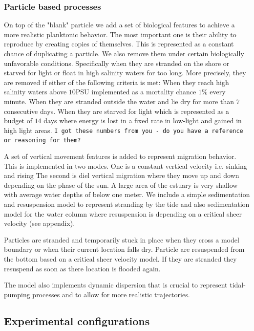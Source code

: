 \documentclass[npg, manuscript]{copernicus}
\begin{document}
\subsubsection{Particle based processes}

On top of the "blank" particle we add a set of biological features to achieve a more realistic planktonic behavior.
The most important one is their ability to reproduce by creating copies of themselves.
This is represented as a constant chance of duplicating a particle.
We also remove them under certain biologically unfavorable conditions. Specifically when they are stranded on the shore or starved for light or float in high salinity waters for too long.
More precisely, they are removed if either of the following criteria is met: 
When they reach high salinity waters above $10$PSU implemented as a mortality chance $1\%$ every minute.
When they are stranded outside the water and lie dry for more than $7$ consecutive days.
When they are starved for light which is represented as a budget of $14$ days 
where energy is lost in a fixed rate in low-light and gained in high light areas.
\texttt{I got these numbers from you - do you have a reference or reasoning for them?}

A set of vertical movement features is added to represent migration behavior. 
This is implemented in two modes. 
One is a constant vertical velocity i.e. sinking and rising
The second is diel vertical migration where they move up and down depending on the phase of the sun.
A large area of the estuary is very shallow with average water depths of below one meter. 
We include a simple sedimentation and resuspension model to represent stranding by the tide and also sedimentation model for the water column where resuspension is depending on a critical sheer velocity (see appendix).

Particles are stranded and temporarily stuck in place when they cross a model boundary or when their current location falls dry. 
Particle are resuspended from the bottom based on a critical sheer velocity model.
If they are stranded they resuspend as soon as there location is flooded again.

The model also implements dynamic dispersion that is crucial to represent tidal-pumping processes and to allow for more realistic trajectories.

\subsection{Experimental configurations}
\end{document}
